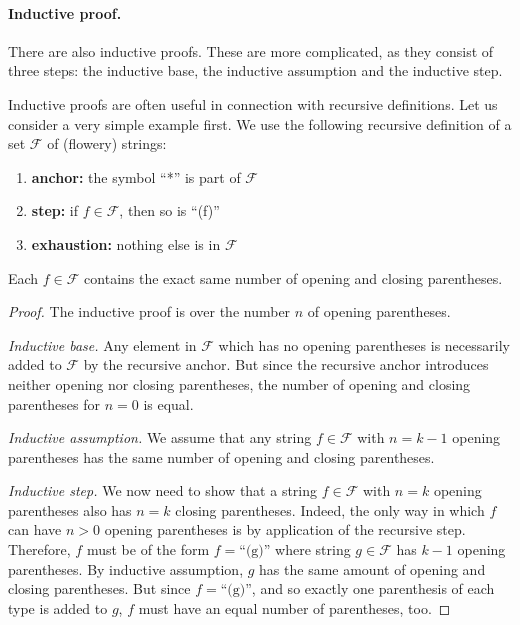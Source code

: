 \documentclass[nobib,nofonts]{tufte-handout}
\begin{document}
\paragraph{Inductive proof.}
There are also inductive proofs.
These are more complicated, as they consist of three steps: the inductive base, the inductive assumption and the inductive step.

Inductive proofs are often useful in connection with recursive definitions.
Let us consider a very simple example first.
We use the following recursive definition of a set $\mathcal{F}$ of (flowery) strings:

\begin{enumerate}
  \item \textbf{anchor:} the symbol ``*'' is part of $\mathcal{F}$
  \item \textbf{step:} if $f \in \mathcal{F}$, then so is ``(f)''
  \item \textbf{exhaustion:} nothing else is in $\mathcal{F}$
\end{enumerate}


\begin{proposition}
  Each $f \in \mathcal{F}$ contains the exact same number of opening and closing parentheses.
\end{proposition}

\begin{proof}
  The inductive proof is over the number $n$ of opening parentheses.

  \emph{Inductive base.}
  Any element in $\mathcal{F}$ which has no opening parentheses is necessarily added to $\mathcal{F}$ by the recursive anchor. But since the recursive anchor introduces neither opening nor closing parentheses, the number of opening and closing parentheses for $n=0$ is equal.

  \emph{Inductive assumption.} We assume that any string $f \in \mathcal{F}$ with $n = k-1$ opening parentheses has the same number of opening and closing parentheses.

  \emph{Inductive step.}
  We now need to show that a string $f \in \mathcal{F}$ with $n=k$ opening parentheses also has $n=k$ closing parentheses.
  Indeed, the only way in which $f$ can have $n>0$ opening parentheses is by application of the recursive step.
  Therefore, $f$ must be of the form $f = \text{``(g)''}$ where string $g \in \mathcal{F}$ has $k-1$ opening parentheses.
  By inductive assumption, $g$ has the same amount of opening and closing parentheses.
  But since $f = \text{``(g)''}$, and so exactly one parenthesis of each type is added to $g$, $f$ must have an equal number of parentheses, too.
\end{proof}
\end{document}
